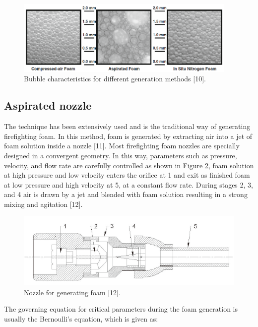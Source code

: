 \documentclass[12pt]{report}
\begin{document}
\begin{figure}[H]
    \centering
    \includegraphics[width=0.95\textwidth]{bubble_characteristics.png}
    \caption{Bubble characteristics for different generation methods [10].}
    \label{ch2:figure:characteristics}
\end{figure}

\subsection{Aspirated nozzle}
The technique has been extensively used and is the traditional way of generating firefighting foam. In this method, foam is generated by extracting air into a jet of foam solution inside a nozzle [11]. Most firefighting foam nozzles are specially designed in a convergent geometry. In this way, parameters such as pressure, velocity, and flow rate are carefully controlled as shown in Figure \ref{ch2:figure:nozzle}, foam solution at high pressure and low velocity enters the orifice at 1 and exit as finished foam at low pressure and high velocity at 5, at a constant flow rate. During stages 2, 3, and 4 air is drawn by a jet and blended with foam solution resulting in a strong mixing and agitation [12].

\begin{figure}[H]
    \centering
    \includegraphics[width=\textwidth]{foam_generating_nozzle.png}
    \caption{Nozzle for generating foam [12].}
    \label{ch2:figure:nozzle}
\end{figure}

The governing equation for critical parameters during the foam generation is usually the Bernoulli’s equation, which is given as:
\end{document}
